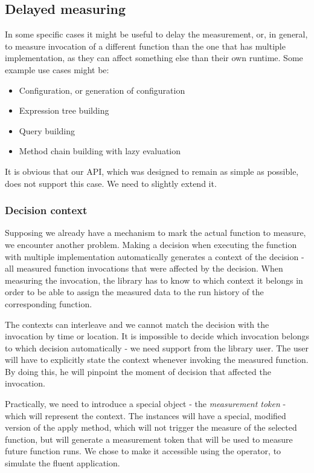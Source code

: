 
\subsection{Delayed measuring}
\label{subsec:delayed_measuring}

In some specific cases it might be useful to delay the measurement, or, in general, to measure invocation of a different function than the one that has multiple implementation, as they can affect something else than their own runtime. Some example use cases might be:

\begin{itemize}
	\item Configuration, or generation of configuration
	\item Expression tree building
	\item Query building
	\item Method chain building with lazy evaluation
\end{itemize}

It is obvious that our API, which was designed to remain as simple as possible, does not support this case. We need to slightly extend it.

\subsubsection{Decision context}

Supposing we already have a mechanism to mark the actual function to measure, we encounter another problem. Making a decision when executing the function with multiple implementation automatically generates a context of the decision - all measured function invocations that were affected by the decision. When measuring the invocation, the library has to know to which context it belongs in order to be able to assign the measured data to the run history of the corresponding function.

The contexts can interleave and we cannot match the decision with the invocation by time or location. It is impossible to decide which invocation belongs to which decision automatically - we need support from the library user. The user will have to explicitly state the context whenever invoking the measured function. By doing this, he will pinpoint the moment of decision that affected the invocation.

Practically, we need to introduce a special object - the \textit{measurement token} - which will represent the context. The  instances will have a special, modified version of the apply method, which will not trigger the measure of the selected function, but will generate a measurement token that will be used to measure future function runs. We chose to make it accessible using the \inlinecode{\textasciicircum()} operator, to simulate the fluent application.

